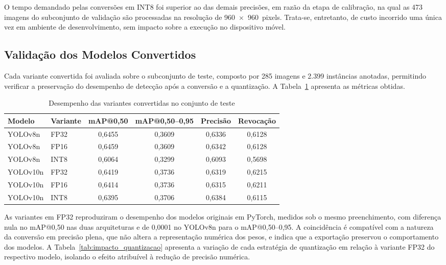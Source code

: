 \documentclass[artigo,times,capa]{iftex2024}
\begin{document}
O tempo demandado pelas conversões em \ac{INT8} foi superior ao das demais precisões, em razão da etapa de calibração, na qual as 473 imagens do subconjunto de validação são processadas na resolução de 960~$\times$~960~pixels. Trata-se, entretanto, de custo incorrido uma única vez em ambiente de desenvolvimento, sem impacto sobre a execução no dispositivo móvel.

\subsection{Validação dos Modelos Convertidos}
\label{sec:validacao_convertidos}

Cada variante convertida foi avaliada sobre o subconjunto de teste, composto por 285 imagens e 2.399 instâncias anotadas, permitindo verificar a preservação do desempenho de detecção após a conversão e a quantização. A Tabela~\ref{tab:validacao_tflite} apresenta as métricas obtidas.

\begin{table}[H]
\centering
\caption{Desempenho das variantes convertidas no conjunto de teste}
\label{tab:validacao_tflite}
\begin{tabular}{llcccc}
\toprule
\textbf{Modelo} & \textbf{Variante} & \textbf{\ac{mAP}@0,50} &
\textbf{\ac{mAP}@0,50--0,95} & \textbf{Precisão} & \textbf{Revocação} \\
\midrule
YOLOv8n  & \ac{FP32} & 0,6455 & 0,3609 & 0,6336 & 0,6128 \\
YOLOv8n  & \ac{FP16} & 0,6459 & 0,3609 & 0,6342 & 0,6128 \\
YOLOv8n  & \ac{INT8} & 0,6064 & 0,3299 & 0,6093 & 0,5698 \\
YOLOv10n & \ac{FP32} & 0,6419 & 0,3736 & 0,6319 & 0,6215 \\
YOLOv10n & \ac{FP16} & 0,6414 & 0,3736 & 0,6315 & 0,6211 \\
YOLOv10n & \ac{INT8} & 0,6395 & 0,3706 & 0,6384 & 0,6115 \\
\bottomrule
\end{tabular}
\end{table}

As variantes em \ac{FP32} reproduziram o desempenho dos modelos originais em PyTorch, medidos sob o mesmo preenchimento, com diferença nula no \ac{mAP}@0,50 nas duas arquiteturas e de 0,0001 no YOLOv8n para o \ac{mAP}@0,50--0,95. A coincidência é compatível com a natureza da conversão em precisão plena, que não altera a representação numérica dos pesos, e indica que a exportação preservou o comportamento dos modelos. A Tabela~\ref{tab:impacto_quantizacao} apresenta a variação de cada estratégia de quantização em relação à variante \ac{FP32} do respectivo modelo, isolando o efeito atribuível à redução de precisão numérica.
\end{document}
